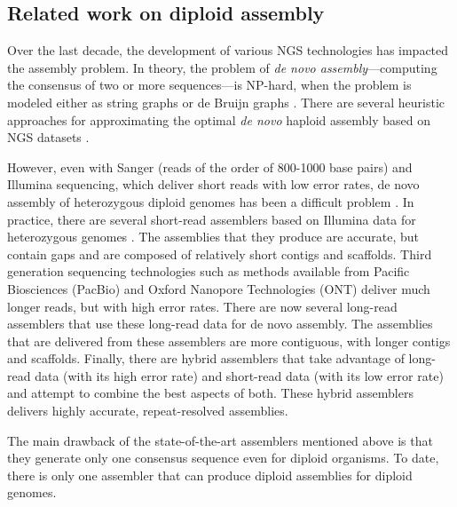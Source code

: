 \subsection{Related work on diploid assembly}
Over the last decade, the development of various NGS technologies has impacted the assembly problem.
In theory, the problem of \textit{de novo assembly}---computing the consensus of two or more sequences---is NP-hard, when the problem is modeled either as string graphs or de Bruijn graphs \citep{medvedev2007computability}. 
There are several heuristic approaches for approximating the optimal \textit{de novo} haploid assembly based on NGS datasets \citep{idury1995new, myers1995toward, myers2005fragment, pevzner2001eulerian, nagarajan2009parametric, nagarajan2013sequence, sovic2013approaches}.

However, even with Sanger (reads of the order of 800-1000 base pairs) and Illumina sequencing, which deliver short reads with low error rates, de novo assembly of heterozygous diploid genomes has been a difficult problem \citep{vinson2005assembly, levy2007diploid}.
In practice, there are several short-read assemblers based on Illumina data for heterozygous genomes \citep{kajitani2014efficient, pryszcz2016redundans, simpson2012efficient, bankevich2012spades, li2015fermikit}.
The assemblies that they produce are accurate, but contain gaps and are composed of relatively short contigs and scaffolds. 
Third generation sequencing technologies such as methods available from Pacific Biosciences (PacBio) and Oxford Nanopore Technologies (ONT) deliver much longer reads, but with high error rates.
There are now several long-read assemblers \citep{koren2017canu, vaser2017fast, xiao2016mecat, berlin2015assembling, chin2013nonhybrid, hunt2015circlator, lin2016assembly} that use these long-read data for de novo assembly.
The assemblies that are delivered from these assemblers are more contiguous, with longer contigs and scaffolds.
Finally, there are hybrid assemblers that take advantage of long-read data (with its high error rate) and short-read data (with its low error rate) \citep{bashir2012hybrid, antipov2015hybridspades, zimin2017hybrid} and attempt to combine the best aspects of both.
These hybrid assemblers delivers highly accurate, repeat-resolved assemblies.

The main drawback of the state-of-the-art assemblers mentioned above is that they generate only one consensus sequence even for diploid organisms. To date, there is only one assembler that can produce diploid assemblies for diploid genomes.

